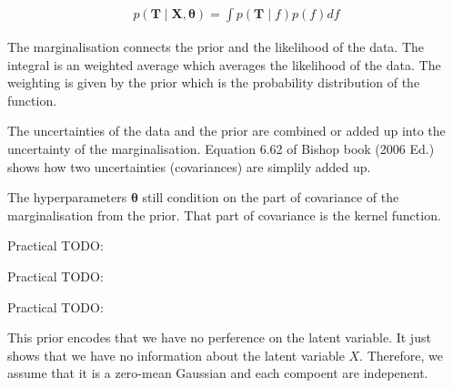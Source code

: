 \documentclass[12pt]{article}
\newenvironment{question}[2][Question]{\begin{trivlist}
\kern10pt
\item[\hskip \labelsep {\bfseries #1}\hskip \labelsep {\bfseries #2.}]}{\end{trivlist}}
\begin{document}
\begin{question}{8}
\begin{align*}
  p(\mathbf{T} \mid \mathbf{X}, \bm{\theta}) = \int p(\mathbf{T}\mid f)p(f) df
\end{align*}

The marginalisation connects the prior and the likelihood of the data. The
 integral is an weighted average which averages the likelihood of the data.
 The weighting is given by the prior which is the probability distribution of
 the function.

The uncertainties of the data and the prior are combined or added up into the 
 uncertainty of the marginalisation. Equation 6.62 of Bishop book (2006 Ed.) shows
 how two uncertainties (covariances) are simplily added up.

The hyperparameters $\bm{\theta}$ still condition on the part of covariance of the 
 marginalisation from the prior. That part of covariance is the kernel function.
\end{question}

\begin{question}{9}
  Practical TODO:
\end{question}

\begin{question}{10}
  Practical TODO:
\end{question}

\begin{question}{11}
  Practical TODO:
\end{question}

\begin{question}{12}
This prior encodes that we have no perference on the latent variable. It just 
 shows that we have no information about the latent variable $X$. Therefore, 
 we assume that it is a zero-mean Gaussian and each compoent are indepenent.
\end{question}
\end{document}
